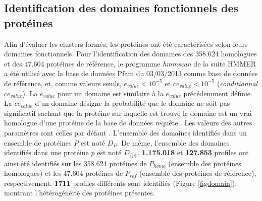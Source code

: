 \subsection{Identification des domaines fonctionnels des protéines}\label{pardomaine}
	Afin d'évaluer les clusters formés, les protéines ont été caractérisées selon leurs domaines fonctionnels. Pour l'identification des domaines des 358.624 homologues et des 47.604 protéines de référence, le programme \textit{hmmscan} de la suite HMMER a été utilisé avec la base de données Pfam du 03/03/2013 comme base de données de référence, et, comme valeurs seuils, $e_{value}<10^{-5}$ et  $ce_{value}<10^{-5}$ (\textit{conditionnal $ce_{value}$}). La $e_{value}$ pour un domaine est similaire à la $e_{value}$ précédemment définie. La $ce_{value}$ d'un domaine désigne la probabilité que le domaine ne soit pas significatif sachant que la protéine sur laquelle est trouvé le domaine est un vrai homologue d'une protéine de la base de données requête \citep{finn2011hmmer}. Les valeurs des autres paramètres sont celles par défaut \citep{Eddy2013}. L'ensemble des domaines identifiés dans un ensemble de protéines $P$ est noté $D_{P}$. De même, l'ensemble des domaines identifiés dans une protéine $p$ est noté $D_{\{p\}}$.  \textbf{1.175.018} et \textbf{127.853} profiles ont ainsi été identifiés sur les 358.624 protéines de $P_{homo}$ (ensemble des protéines homologues) et les 47.604 protéines de $P_{ref}$ (ensemble des protéines de référence), respectivement. \textbf{1711} profiles différents sont identifiés (Figure \ref{figdomain}), montrant l'hétérogénéité des protéines présentes.
	
